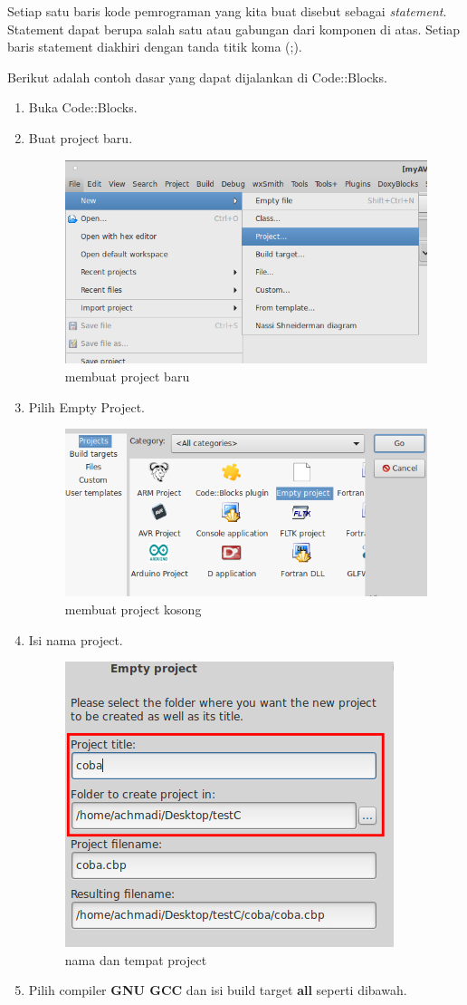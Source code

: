 \documentclass[12pt,]{article}
\begin{document}
	Setiap satu baris kode pemrograman yang kita buat disebut sebagai \textit{statement}.
	Statement dapat berupa salah satu atau gabungan dari komponen di atas.
	Setiap baris statement diakhiri dengan tanda titik koma (;).

	Berikut adalah contoh dasar yang dapat dijalankan di Code::Blocks.
	\begin{enumerate}
		\item Buka Code::Blocks.
		\item Buat project baru.
		\begin{figure}[H]
			\centering
			\includegraphics[width=0.5\linewidth]{images/c_cb_0}
			\caption{membuat project baru}
		\end{figure}
		\item Pilih Empty Project.
		\begin{figure}[H]
			\centering
			\includegraphics[width=0.4\linewidth]{images/c_cb_1}
			\caption{membuat project kosong}
		\end{figure}
		\item Isi nama project.
		\begin{figure}[H]
			\centering
			\includegraphics[width=0.35\linewidth]{images/c_cb_2}
			\caption{nama dan tempat project}
		\end{figure}
		\item Pilih compiler \textbf{GNU GCC} dan isi build target \textbf{all} seperti dibawah.
		\begin{figure}[H]

\end{figure}
\end{enumerate}
\end{document}
